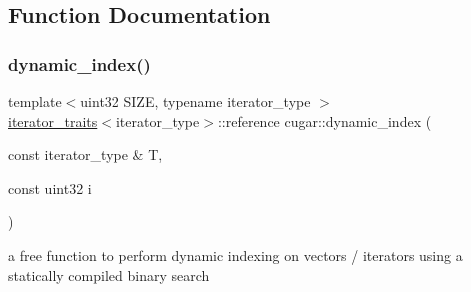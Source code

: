 \subsection{Function Documentation}
\mbox{\label{group___register_arrays_module_ga312bfb0737a477266b603285bac022df}} 
\subsubsection{\texorpdfstring{dynamic\+\_\+index()}{dynamic\_index()}}
{\footnotesize\ttfamily template$<$uint32 S\+I\+ZE, typename iterator\+\_\+type $>$ \\
\hyperlink{structcugar_1_1iterator__traits}{iterator\+\_\+traits}$<$iterator\+\_\+type$>$\+::reference cugar\+::dynamic\+\_\+index (\begin{DoxyParamCaption}\item[{const iterator\+\_\+type \&}]{T,  }\item[{const uint32}]{i }\end{DoxyParamCaption})}

a free function to perform dynamic indexing on vectors / iterators using a statically compiled binary search 